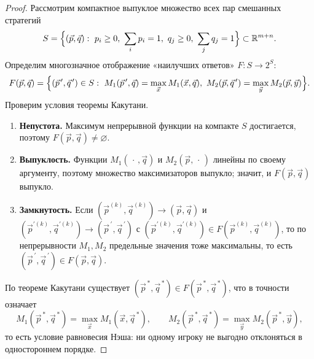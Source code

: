 \begin{proof}
	Рассмотрим компактное выпуклое множество всех пар смешанных стратегий
	\[
	S=\Bigl\{(\vec p,\vec q):\ p_i\ge 0,\ \sum_i p_i=1,\ q_j\ge 0,\ \sum_j q_j=1\Bigr\}\subset\mathbb{R}^{m+n}.
	\]
	Определим многозначное отображение «наилучших ответов» $F\colon S\to 2^S$:
	\[
	F(\vec p,\vec q)=\Bigl\{(\vec p^{\,\prime},\vec q^{\,\prime})\in S:\
	M_1(\vec p^{\,\prime},\vec q)=\max_{\vec x}M_1(\vec x,\vec q),\
	M_2(\vec p,\vec q^{\,\prime})=\max_{\vec y}M_2(\vec p,\vec y)\Bigr\}.
	\]
	Проверим условия теоремы Какутани.
	\begin{enumerate}
		\item \textbf{Непустота.} Максимум непрерывной функции на компакте $S$ достигается, поэтому $F(\vec p,\vec q)\ne\varnothing$.
		\item \textbf{Выпуклость.} Функции $M_1(\,\cdot\,,\vec q)$ и $M_2(\vec p,\,\cdot\,)$ линейны по своему аргументу, поэтому множество максимизаторов выпукло; значит, и $F(\vec p,\vec q)$ выпукло.
		\item \textbf{Замкнутость.} Если $(\vec p^{(k)},\vec q^{(k)})\to(\vec p,\vec q)$ и $(\vec p^{\prime(k)},\vec q^{\prime(k)})\to(\vec p^{\,\prime},\vec q^{\,\prime})$ с $(\vec p^{\prime(k)},\vec q^{\prime(k)})\in F(\vec p^{(k)},\vec q^{(k)})$, то по непрерывности $M_1,M_2$ предельные значения тоже максимальны, то есть $(\vec p^{\,\prime},\vec q^{\,\prime})\in F(\vec p,\vec q)$.
	\end{enumerate}
	По теореме Какутани существует $(\vec p^{\,*},\vec q^{\,*})\in F(\vec p^{\,*},\vec q^{\,*})$, что в точности означает
	\[
	M_1(\vec p^{\,*},\vec q^{\,*})=\max_{\vec x}M_1(\vec x,\vec q^{\,*}),\qquad
	M_2(\vec p^{\,*},\vec q^{\,*})=\max_{\vec y}M_2(\vec p^{\,*},\vec y),
	\]
	то есть условие равновесия Нэша: ни одному игроку не выгодно отклоняться в одностороннем порядке.
\end{proof}

